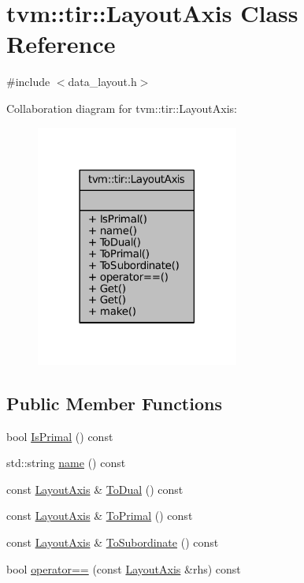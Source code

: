 \hypertarget{classtvm_1_1tir_1_1LayoutAxis}{}\section{tvm\+:\+:tir\+:\+:Layout\+Axis Class Reference}
\label{classtvm_1_1tir_1_1LayoutAxis}


{\ttfamily \#include $<$data\+\_\+layout.\+h$>$}



Collaboration diagram for tvm\+:\+:tir\+:\+:Layout\+Axis\+:
\nopagebreak
\begin{figure}[H]
\begin{center}
\leavevmode
\includegraphics[width=189pt]{classtvm_1_1tir_1_1LayoutAxis__coll__graph}
\end{center}
\end{figure}
\subsection*{Public Member Functions}
\begin{DoxyCompactItemize}
\item 
bool \hyperlink{classtvm_1_1tir_1_1LayoutAxis_a13e11bef75e29b71977779124f72e1b9}{Is\+Primal} () const 
\item 
std\+::string \hyperlink{classtvm_1_1tir_1_1LayoutAxis_a79346e18a79feccd955471d13212fa15}{name} () const 
\item 
const \hyperlink{classtvm_1_1tir_1_1LayoutAxis}{Layout\+Axis} \& \hyperlink{classtvm_1_1tir_1_1LayoutAxis_ac30849455035a3b095198ad36f83f2eb}{To\+Dual} () const 
\item 
const \hyperlink{classtvm_1_1tir_1_1LayoutAxis}{Layout\+Axis} \& \hyperlink{classtvm_1_1tir_1_1LayoutAxis_ada7181b764f93bdd1d4cedf476922364}{To\+Primal} () const 
\item 
const \hyperlink{classtvm_1_1tir_1_1LayoutAxis}{Layout\+Axis} \& \hyperlink{classtvm_1_1tir_1_1LayoutAxis_aa58f0180c060e912d9e83cdd0922d152}{To\+Subordinate} () const 
\item 
bool \hyperlink{classtvm_1_1tir_1_1LayoutAxis_a0234c6380a757b4a36f4dcba25dc6b21}{operator==} (const \hyperlink{classtvm_1_1tir_1_1LayoutAxis}{Layout\+Axis} \&rhs) const 
\end{DoxyCompactItemize}
